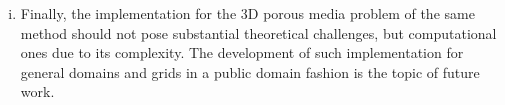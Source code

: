 \documentclass[3p]{elsarticle}
\begin{document}
\begin{enumerate}[(i)]
\item Finally, the implementation for the 3D porous media problem of the same method should not pose substantial theoretical challenges, but computational ones due to its complexity. The development of such implementation for general domains and grids in a public domain fashion is the topic of future work. 
%
\end{enumerate}
%
%
%
%
%
%
%
\end{document}
